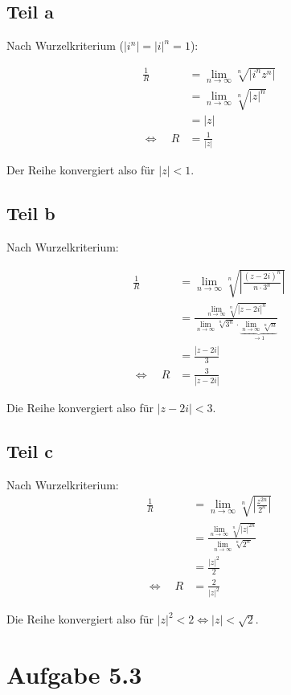 \documentclass[a4paper,german,12pt,smallheadings]{scrartcl}
\begin{document}
\subsection*{Teil a}
Nach Wurzelkriterium ($|i^n| = |i|^n = 1$):

\begin{align*}
  \frac{1}{R} &= \lim_{n \to \infty} \sqrt[n]{|i^nz^n|} \\
              &= \lim_{n \to \infty} \sqrt[n]{|z|^n} \\
              &= |z| \\
  \Leftrightarrow\quad R &= \frac{1}{|z|}
\end{align*}

Der Reihe konvergiert also für $|z| < 1$.

\subsection*{Teil b}
Nach Wurzelkriterium:

\begin{align*}
  \frac{1}{R} &= \lim_{n \to \infty} \sqrt[n]{\left|\frac{(z-2i)^n}{n\cdot3^n}\right|} \\
              &= \frac{\lim_{n \to \infty} \sqrt[n]{|z-2i|^n}}{\lim_{n \to \infty} \sqrt[n]{3^n} \cdot \underbrace{\lim_{n \to \infty} \sqrt[n]{n}}_{\to 1}} \\
              &= \frac{|z-2i|}{3} \\
  \Leftrightarrow\quad R &= \frac{3}{|z-2i|}
\end{align*}

Die Reihe konvergiert also für $|z-2i| < 3$.

\subsection*{Teil c}
Nach Wurzelkriterium:
\begin{align*}
  \frac{1}{R} &= \lim_{n \to \infty} \sqrt[n]{\left|\frac{z^{2n}}{2^n}\right|} \\
              &= \frac{\lim_{n \to \infty} \sqrt[n]{|z|^{2n}}}{\lim_{n \to \infty} \sqrt[n]{2^n}} \\
              &= \frac{|z|^2}{2} \\
  \Leftrightarrow\quad R &= \frac{2}{|z|^2}
\end{align*}

Die Reihe konvergiert also für $|z|^2 < 2 \Leftrightarrow |z| < \sqrt{2}$.

\section*{Aufgabe 5.3}
\end{document}
